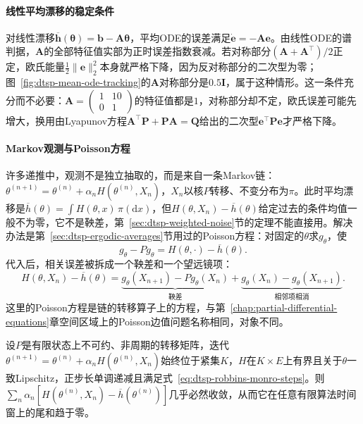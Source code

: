 \paragraph{线性平均漂移的稳定条件}
对线性漂移$\overline{\bm h}(\bm\theta)=\bm b-\bm A\bm\theta$，平均ODE的误差满足$\dot{\bm e}=-\bm A\bm e$。由线性ODE的谱判据，$\bm A$的全部特征值实部为正时误差指数衰减。若对称部分$(\bm A+\bm A^{\top})/2$正定，欧氏能量$\frac12\lVert\bm e\rVert_2^2$本身就严格下降，因为反对称部分的二次型为零；图~\ref{fig:dtsp-mean-ode-tracking}的$\bm A$对称部分是$0.5\bm I$，属于这种情形。这一条件充分而不必要：$\bm A=\left(\begin{smallmatrix}1&10\\0&1\end{smallmatrix}\right)$的特征值都是$1$，对称部分却不定，欧氏误差可能先增大，换用由Lyapunov方程$\bm A^{\top}\bm P+\bm P\bm A=\bm Q$给出的二次型$\bm e^{\top}\bm P\bm e$才严格下降。

\paragraph{Markov观测与Poisson方程}
许多递推中，观测不是独立抽取的，而是来自一条Markov链：$\theta^{(n+1)}=\theta^{(n)}+\alpha_nH(\theta^{(n)},X_n)$，$X_n$以核$P$转移、不变分布为$\pi$。此时平均漂移是$\overline h(\theta)=\int H(\theta,x)\,\pi(\mathrm dx)$，但$H(\theta,X_n)-\overline h(\theta)$给定过去的条件均值一般不为零，它不是鞅差，第~\ref{sec:dtsp-weighted-noise}节的定理不能直接用。解决办法是第~\ref{sec:dtsp-ergodic-averages}节用过的Poisson方程：对固定的$\theta$求$g_\theta$，使
\[
  g_\theta-Pg_\theta=H(\theta,\cdot)-\overline h(\theta).
\]
代入后，相关误差被拆成一个鞅差和一个望远镜项：
\[
  H(\theta,X_n)-\overline h(\theta)=\underbrace{g_\theta(X_{n+1})-Pg_\theta(X_n)}_{\text{鞅差}}+\underbrace{g_\theta(X_n)-g_\theta(X_{n+1})}_{\text{相邻项相消}}.
\]
这里的Poisson方程是链的转移算子上的方程，与第~\ref{chap:partial-differential-equations}章空间区域上的Poisson边值问题名称相同，对象不同。

\begin{lemma}[有限链上的加权Poisson分解]
  \label{lem:dtsp-finite-poisson-sum}
  设$P$是有限状态上不可约、非周期的转移矩阵，迭代$\theta^{(n+1)}=\theta^{(n)}+\alpha_nH(\theta^{(n)},X_n)$始终位于紧集$K$，$H$在$K\times E$上有界且关于$\theta$一致Lipschitz，正步长单调递减且满足式~\eqref{eq:dtsp-robbins-monro-steps}。则$\sum_n\alpha_n[H(\theta^{(n)},X_n)-\overline h(\theta^{(n)})]$几乎必然收敛，从而它在任意有限算法时间窗上的尾和趋于零。
\end{lemma}

